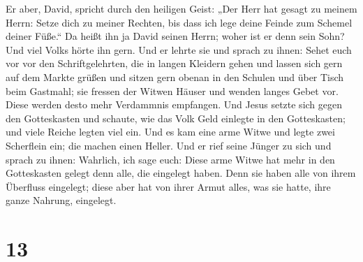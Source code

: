  Er aber, David, spricht durch den heiligen Geist: „Der
Herr hat gesagt zu meinem Herrn: Setze dich zu meiner Rechten, bis dass
ich lege deine Feinde zum Schemel deiner Füße.``  Da
heißt ihn ja David seinen Herrn; woher ist er denn sein Sohn? Und viel
Volks hörte ihn gern.  Und er lehrte sie und sprach zu
ihnen: Sehet euch vor vor den Schriftgelehrten, die in langen Kleidern
gehen und lassen sich gern auf dem Markte grüßen  und
sitzen gern obenan in den Schulen und über Tisch beim Gastmahl;
 sie fressen der Witwen Häuser und wenden langes Gebet
vor. Diese werden desto mehr Verdammnis empfangen.  Und
Jesus setzte sich gegen den Gotteskasten und schaute, wie das Volk Geld
einlegte in den Gotteskasten; und viele Reiche legten viel ein.
 Und es kam eine arme Witwe und legte zwei Scherflein
ein; die machen einen Heller.  Und er rief seine Jünger
zu sich und sprach zu ihnen: Wahrlich, ich sage euch: Diese arme Witwe
hat mehr in den Gotteskasten gelegt denn alle, die eingelegt haben.
 Denn sie haben alle von ihrem Überfluss eingelegt; diese
aber hat von ihrer Armut alles, was sie hatte, ihre ganze Nahrung,
eingelegt.

\hypertarget{section-12}{%
\section{13}\label{section-12}}

